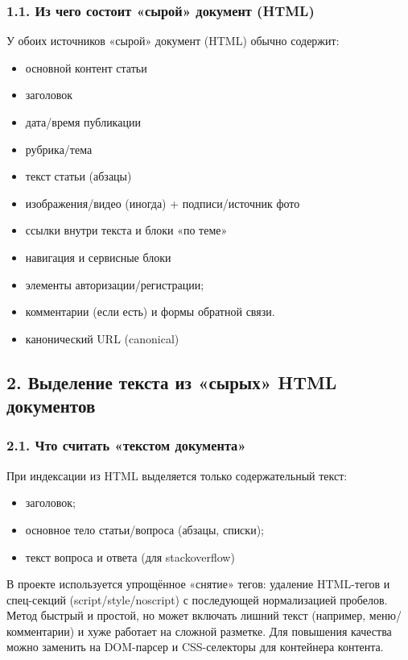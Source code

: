 \documentclass[12pt,a4paper]{article}
\begin{document}
\subsubsection*{1.1. Из чего состоит «сырой» документ (HTML)}

У обоих источников «сырой» документ (HTML) обычно содержит:

\begin{itemize}
\item основной контент статьи
\item заголовок
\item дата/время публикации
\item рубрика/тема
\item текст статьи (абзацы)
\item изображения/видео (иногда) + подписи/источник фото
\item ссылки внутри текста и блоки «по теме»
\item навигация и сервисные блоки
\item элементы авторизации/регистрации;
\item комментарии (если есть) и формы обратной связи.
\item канонический URL (canonical)
\end{itemize}
\subsection*{2. Выделение текста из «сырых» HTML документов}

\subsubsection*{2.1. Что считать «текстом документа»}

При индексации из HTML выделяется только содержательный текст:

\begin{itemize}
\item заголовок;
\item основное тело статьи/вопроса (абзацы, списки);
\item текст вопроса и ответа (для stackoverflow)
\end{itemize}
В проекте используется упрощённое «снятие» тегов: удаление HTML-тегов и спец-секций (script/style/noscript) с последующей нормализацией пробелов. Метод быстрый и простой, но может включать лишний текст (например, меню/комментарии) и хуже работает на сложной разметке. Для повышения качества можно заменить на DOM-парсер и CSS-селекторы для контейнера контента.
\end{document}
